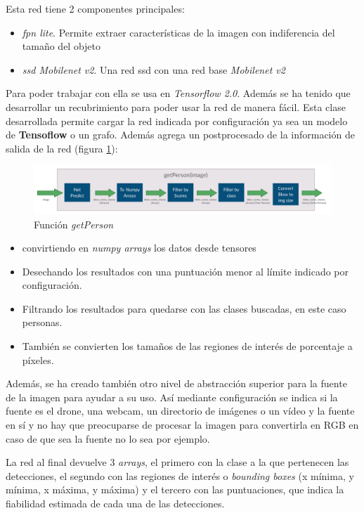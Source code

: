 Esta red tiene 2 componentes principales: 
\begin{itemize}
  \item \textit{\gls{fpn} lite}\cite{fpn}. Permite extraer características de la imagen con indiferencia del tamaño del objeto 
  \item \textit{\gls{ssd} Mobilenet v2}. Una red \acrfull{ssd} con una red base \textit{Mobilenet v2}\cite{mobilenetv2}
\end{itemize}

Para poder trabajar con ella se usa en \textit{Tensorflow 2.0}. Además se ha tenido que desarrollar un recubrimiento para poder usar la red de manera fácil.
Esta clase desarrollada permite cargar la red indicada por configuración ya sea un modelo de \textbf{Tensoflow} o un grafo. Además agrega un postprocesado de la información de salida de la red (figura \ref{fig:getPerson}): 
\begin{figure}[H]
  \begin{center}
    \includegraphics[width=1\textwidth]{figures/real/getPerson.png}
		\caption{Función \textit{getPerson}}
		\label{fig:getPerson}
		\end{center}
\end{figure}
\begin{itemize}
  \item convirtiendo en \textit{numpy arrays} los datos desde tensores
  \item Desechando los resultados con una puntuación menor al límite indicado por configuración.
  \item Filtrando los resultados para quedarse con las clases buscadas, en este caso personas.
  \item También se convierten los tamaños de las regiones de interés de porcentaje a píxeles.
\end{itemize}

Además, se ha creado también otro nivel de abstracción superior para la fuente de la imagen para ayudar a su uso. Así mediante configuración se indica si la fuente es el drone, una webcam, un directorio de imágenes o un vídeo y la fuente en sí y no hay que preocuparse de procesar la imagen para convertirla en RGB en caso de que sea la fuente no lo sea por ejemplo.

La red al final devuelve 3 \textit{arrays}, el primero con la clase a la que pertenecen las detecciones, el segundo con las regiones de interés o \textit{bounding boxes} (x mínima, y mínima, x máxima, y máxima) y el tercero con las puntuaciones, que indica la fiabilidad estimada de cada una de las detecciones.

